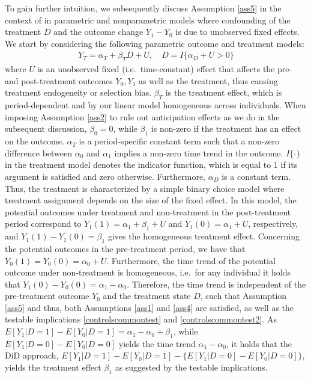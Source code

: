 {	To gain further intuition, we subsequently discuss Assumption \ref{ass5} in the context of in parametric and nonparametric models where confounding of the treatment $D$ and the outcome change $Y_1-Y_0$ is due to unobserved fixed effects. 	We start by considering the following parametric outcome and treatment models:
	\begin{eqnarray}\label{linmodel}
		Y_T= \alpha_T + \beta_T D + U,\quad D=I\{\alpha_D+U>0\}
	\end{eqnarray}
	where $U$ is an unobserved fixed (i.e.\ time-constant) effect that affects the pre- and post-treatment outcomes $Y_0, Y_1$ as well as the treatment, thus causing treatment endogeneity or selection bias.  $\beta_T$ is the treatment effect, which is period-dependent and by our linear model homogeneous across individuals. When imposing Assumption \ref{ass2} to rule out anticipation effects as we do in the subsequent discussion, $\beta_0=0$, while $\beta_1$ is non-zero if the treatment has an effect on the outcome. $\alpha_T$ is a period-specific constant term such that a non-zero difference between $\alpha_0$ and $\alpha_1$ implies a non-zero time trend in the outcome. $I\{\cdot\}$ in the treatment model denotes the indicator function, which is equal to 1 if its argument is satisfied and zero otherwise.
	Furthermore, $\alpha_D$ is a constant term. Thus, the treatment is characterized by a simple binary choice model where treatment assignment depends on the size of the fixed effect. 	
	In this model, the potential outcomes under treatment and non-treatment in the post-treatment period correspond to $Y_1(1)=\alpha_1+\beta_1+U$ and $Y_1(0)= \alpha_1+U $, respectively, and $Y_1(1)-Y_1(0)=\beta_1$ gives the homogeneous treatment effect. Concerning the potential outcomes in the pre-treatment period, we have that $Y_0(1)= Y_0(0)= \alpha_0 + U $. Furthermore, the time trend of the potential outcome under non-treatment is homogeneous, i.e.\ for any individual it holds that $Y_1(0)-Y_0(0)=\alpha_1-\alpha_0$. Therefore, the time trend is independent of the pre-treatment outcome $Y_0$ and the treatment state $D$, such that
	Assumption \ref{ass5} and thus, both Assumptions \ref{ass1} and \ref{ass4} are satisfied, as well as the testable implications \eqref{controlscommontest} and \eqref{controlscommontest2}. As $E[Y_1|D=1]-E[Y_0|D=1]=\alpha_1-\alpha_0+\beta_1$, while $E[Y_1|D=0]-E[Y_0|D=0]$ yields the time trend $\alpha_1-\alpha_0$, it holds that the DiD approach, $E[Y_1|D=1]-E[Y_0|D=1]-\{ E[Y_1|D=0]-E[Y_0|D=0]\}$, yields the treatment effect $\beta_1$ as suggested by the testable implications.
	
}
